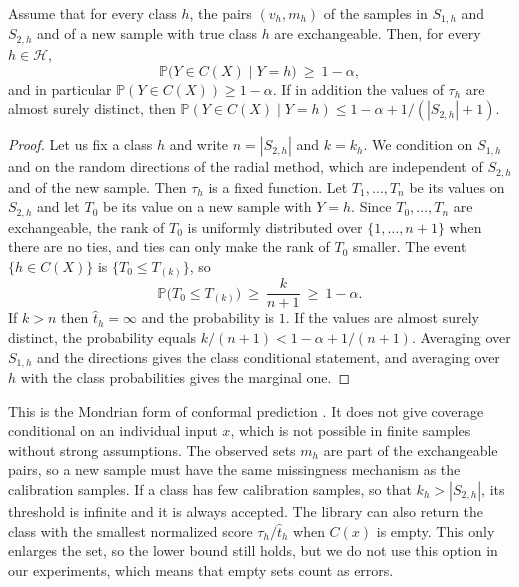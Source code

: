 \begin{theorem}\label{thm:coverage}
Assume that for every class $h$, the pairs $(v_h,m_h)$ of the samples in $S_{1,h}$ and $S_{2,h}$ and of a new sample with true 
class $h$ are exchangeable. Then, for every $h\in\mathcal H$,
\[ \mathbb P\bigl(Y\in C(X)\mid Y=h\bigr)\ \ge\ 1-\alpha ,\]
and in particular $\mathbb P(Y\in C(X))\ge 1-\alpha$. If in addition the values of $\tau_h$ are almost surely distinct, then 
$\mathbb P(Y\in C(X)\mid Y=h)\le 1-\alpha+1/(|S_{2,h}|+1)$.
\end{theorem}

\begin{proof}
Let us fix a class $h$ and write $n=|S_{2,h}|$ and $k=k_h$. We condition on $S_{1,h}$ and on the random directions of the radial 
method, which are independent of $S_{2,h}$ and of the new sample. Then $\tau_h$ is a fixed function. Let $T_1,\dots,T_n$ be its 
values on $S_{2,h}$ and let $T_0$ be its value on a new sample with $Y=h$. Since $T_0, \dots, T_n$ are exchangeable, the rank of 
$T_0$ is uniformly distributed over $\{1, \dots, n+1\}$ when there are no ties, and ties can only make the rank of $T_0$ smaller. 
The event $\{h\in C(X)\}$ is $\{T_0\le T_{(k)}\}$, so  \[ \mathbb P\bigl(T_0\le T_{(k)}\bigr)\ \ge\ \frac{k}{n+1}\ \ge\ 1-\alpha .\]
If $k>n$ then $\hat t_h=\infty$ and the probability is $1$. If the values are almost surely distinct, the probability equals 
$k/(n+1)<1-\alpha+1/(n+1)$. Averaging over $S_{1,h}$ and the directions gives the class conditional statement, and averaging over 
$h$ with the class probabilities gives the marginal one.
\end{proof}

This is the Mondrian form of conformal prediction \citep{vovk2005algorithmic}. It does not give coverage conditional on an 
individual input $x$, which is not possible in finite samples without strong assumptions. The observed sets $m_h$ are part of the 
exchangeable pairs, so a new sample must have the same missingness mechanism as the calibration samples. If a class has few 
calibration samples, so that $k_h>|S_{2,h}|$, its threshold is infinite and it is always accepted. The library can also return 
the class with the smallest normalized score $\tau_h/\hat t_h$ when $C(x)$ is empty. This only enlarges the set, so the lower 
bound still holds, but we do not use this option in our experiments, which means that empty sets count as errors.

